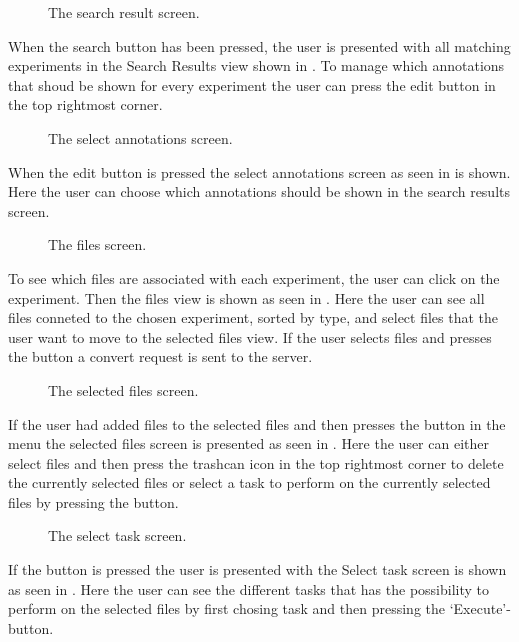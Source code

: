 \begin{figure}[ht]
\caption{The search result screen.}
\label{fig:ios_searchResult}
\end{figure}
\FloatBarrier

When the search button has been pressed, the user is presented with all matching experiments in the Search Results view shown in . To manage which annotations that shoud be shown for every experiment the user can press the edit button in the top rightmost corner.

\begin{figure}[htb]
\caption{The select annotations screen.}
\label{fig:ios_selectAnnotations}
\end{figure}
\FloatBarrier

When the edit button is pressed the select annotations screen as seen in  is shown. Here the user can choose which annotations should be shown in the search results screen. 

\begin{figure}[htb]
\caption{The files screen.}
\label{fig:ios_files}
\end{figure}
\FloatBarrier

To see which files are associated with each experiment, the user can click on the experiment. Then the files view is shown as seen in . Here the user can see all files conneted to the chosen experiment, sorted by type, and select files that the user want to move to the selected files view. If the user selects files and presses the  button a convert request is sent to the server. 

\begin{figure}[htb]
\caption{The selected files screen.}
\label{fig:ios_selectedFiles}
\end{figure}
\FloatBarrier

If the user had added files to the selected files and then presses the  button in the menu the selected files screen is presented as seen in . Here the user can either select files and then press the trashcan icon in the top rightmost corner to delete the currently selected files or select a task to perform on the currently selected files by pressing the  button. 

\begin{figure}[htb]
\caption{The select task screen.}
\label{fig:ios_selectTask}
\end{figure}
\FloatBarrier

If the  button is pressed the user is presented with the Select task screen is shown as seen in . Here the user can see the different tasks that has the possibility to perform on the selected files by first chosing task and then pressing the ‘Execute’-button.  

